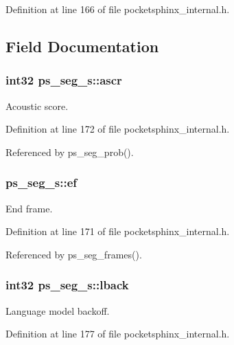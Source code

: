 Definition at line 166 of file pocketsphinx\+\_\+internal.\+h.



\subsection{Field Documentation}
\subsubsection[{ascr}]{\setlength{\rightskip}{0pt plus 5cm}int32 ps\+\_\+seg\+\_\+s\+::ascr}\label{structps__seg__s_a6f7706ec4c0d0ec8ecafaf0f29f41f4b}


Acoustic score. 



Definition at line 172 of file pocketsphinx\+\_\+internal.\+h.



Referenced by ps\+\_\+seg\+\_\+prob().

\subsubsection[{ef}]{ ps\+\_\+seg\+\_\+s\+::ef}\label{structps__seg__s_ab25ecc6af8d2695c6097cf7e934eadd4}


End frame. 



Definition at line 171 of file pocketsphinx\+\_\+internal.\+h.



Referenced by ps\+\_\+seg\+\_\+frames().

\subsubsection[{lback}]{\setlength{\rightskip}{0pt plus 5cm}int32 ps\+\_\+seg\+\_\+s\+::lback}\label{structps__seg__s_a4d86c21f1ed2dc3eb3b1b1b37ce9bb48}


Language model backoff. 



Definition at line 177 of file pocketsphinx\+\_\+internal.\+h.



